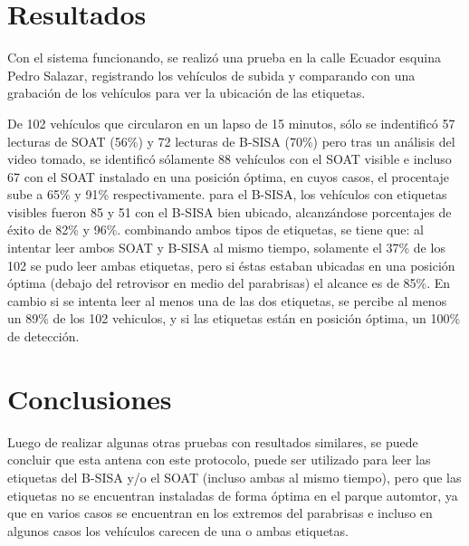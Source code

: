 \documentclass[fleqn,10pt]{SelfArx} %
\begin{document}
\section{Resultados}

Con el sistema funcionando, se realizó una prueba en la calle Ecuador esquina Pedro Salazar, registrando los vehículos de subida y comparando con una grabación de los vehículos para ver la ubicación de las etiquetas.

De 102 vehículos que circularon en un lapso de 15 minutos, sólo se indentificó 57 lecturas de SOAT (56\%) y 72 lecturas de B-SISA (70\%) pero tras un análisis del video tomado, se identificó sólamente 88 vehículos con el SOAT visible e incluso 67 con el SOAT instalado en una posición óptima, en cuyos casos, el procentaje sube a 65\% y 91\% respectivamente. para el B-SISA, los vehículos con etiquetas visibles fueron 85 y 51 con el B-SISA bien ubicado, alcanzándose porcentajes de éxito de 82\% y 96\%. combinando ambos tipos de etiquetas, se tiene que: al intentar leer ambos SOAT y B-SISA al mismo tiempo, solamente el 37\% de los 102 se pudo leer ambas etiquetas, pero si éstas estaban ubicadas en una posición óptima (debajo del retrovisor en medio del parabrisas) el alcance es de 85\%. En cambio si se intenta leer al menos una de las dos etiquetas, se percibe al menos un 89\% de los 102 vehiculos, y si las etiquetas están en posición óptima, un 100\% de detección.

\section{Conclusiones}

Luego de realizar algunas otras pruebas con resultados similares, se puede concluir que esta antena con este protocolo, puede ser utilizado para leer las etiquetas del B-SISA y/o el SOAT (incluso ambas al mismo tiempo), pero que las etiquetas no se encuentran instaladas de forma óptima en el parque automtor, ya que en varios casos se encuentran en los extremos del parabrisas e incluso en algunos casos los vehículos carecen de una o ambas etiquetas.



{}

\end{document}
